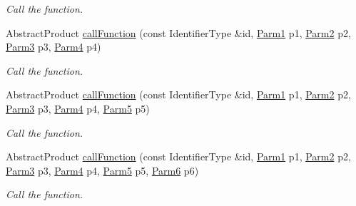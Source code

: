 \begin{DoxyCompactItemize}
\begin{DoxyCompactList}\small\item\em Call the function. \end{DoxyCompactList}\item 
Abstract\+Product \mbox{\hyperlink{classUtil_1_1FunctionMap_a824e671873a79866e30b503f1794cfbf}{call\+Function}} (const Identifier\+Type \&id, \mbox{\hyperlink{classUtil_1_1FunctionMap_a7b842c0101fae8075e8b21c90ede63cb}{Parm1}} p1, \mbox{\hyperlink{classUtil_1_1FunctionMap_a46a76423783c6a8dcc4442ffb8cf54a4}{Parm2}} p2, \mbox{\hyperlink{classUtil_1_1FunctionMap_a4578d42cd0723beba85654aa774d0145}{Parm3}} p3, \mbox{\hyperlink{classUtil_1_1FunctionMap_a912703c1f39a6e219b2449183e48fb07}{Parm4}} p4)
\begin{DoxyCompactList}\small\item\em Call the function. \end{DoxyCompactList}\item 
Abstract\+Product \mbox{\hyperlink{classUtil_1_1FunctionMap_a4f66b55ae4a6c3c82813ee1364faeae9}{call\+Function}} (const Identifier\+Type \&id, \mbox{\hyperlink{classUtil_1_1FunctionMap_a7b842c0101fae8075e8b21c90ede63cb}{Parm1}} p1, \mbox{\hyperlink{classUtil_1_1FunctionMap_a46a76423783c6a8dcc4442ffb8cf54a4}{Parm2}} p2, \mbox{\hyperlink{classUtil_1_1FunctionMap_a4578d42cd0723beba85654aa774d0145}{Parm3}} p3, \mbox{\hyperlink{classUtil_1_1FunctionMap_a912703c1f39a6e219b2449183e48fb07}{Parm4}} p4, \mbox{\hyperlink{classUtil_1_1FunctionMap_a993589d5b721f73c7905377e24dbf9f4}{Parm5}} p5)
\begin{DoxyCompactList}\small\item\em Call the function. \end{DoxyCompactList}\item 
Abstract\+Product \mbox{\hyperlink{classUtil_1_1FunctionMap_ad7318d634f90f1f5cb0e78359c56c405}{call\+Function}} (const Identifier\+Type \&id, \mbox{\hyperlink{classUtil_1_1FunctionMap_a7b842c0101fae8075e8b21c90ede63cb}{Parm1}} p1, \mbox{\hyperlink{classUtil_1_1FunctionMap_a46a76423783c6a8dcc4442ffb8cf54a4}{Parm2}} p2, \mbox{\hyperlink{classUtil_1_1FunctionMap_a4578d42cd0723beba85654aa774d0145}{Parm3}} p3, \mbox{\hyperlink{classUtil_1_1FunctionMap_a912703c1f39a6e219b2449183e48fb07}{Parm4}} p4, \mbox{\hyperlink{classUtil_1_1FunctionMap_a993589d5b721f73c7905377e24dbf9f4}{Parm5}} p5, \mbox{\hyperlink{classUtil_1_1FunctionMap_ae121f4a5c3534a888db59d6702a15b40}{Parm6}} p6)
\begin{DoxyCompactList}\small\item\em Call the function. \end{DoxyCompactList}\item 

\end{DoxyCompactItemize}

